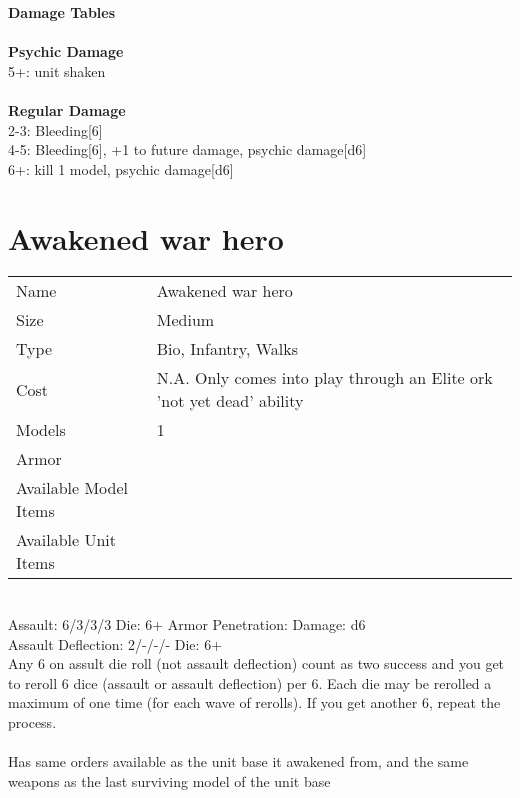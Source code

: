 {\bf Damage Tables} \\
\ \\ {\bf Psychic Damage } \\
5+: unit shaken \\
\ \\ {\bf Regular Damage } \\
2-3: Bleeding[6] \\
4-5: Bleeding[6], +1 to future damage, psychic damage[d6] \\
6+: kill 1 model, psychic damage[d6] \\









\pagebreak

\section{ Awakened war hero }

\begin{tabular}{ll}
  Name & Awakened war hero \\
  Size & Medium\\
  Type & Bio, Infantry, Walks\\
  Cost & N.A. Only comes into play through an Elite ork 'not yet dead' ability\\
  Models & 1\\
  Armor & \\
  Available Model Items &  \\
  Available Unit Items &  \\
\end{tabular}

\ \\
Assault: 6/3/3/3 Die: 6+ Armor Penetration:  Damage: d6 \\
Assault Deflection: 2/-/-/- Die: 6+\\
\indent Any 6 on assult die roll (not assault deflection) count as two success and you get to reroll 6 dice (assault or assault deflection) per 6. Each die may be rerolled a maximum of one time (for each wave of rerolls). If you get another 6, repeat the process.  \\
\ \\
Has same orders available as the unit base it awakened from, and the same weapons as the last surviving model of the unit base
\ \\


